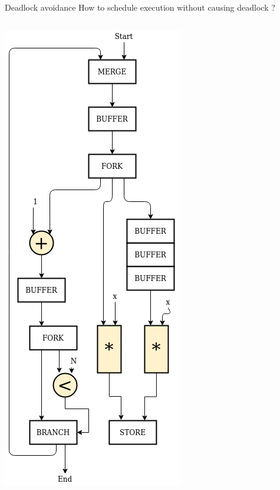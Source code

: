 \documentclass{beamer}
\begin{document}


\begin{frame}{Deadlock avoidance}
  How to schedule execution without causing deadlock ?
  \begin{columns}[T]
    \begin{column}{0.25\textwidth}
        \begin{center}
      \includegraphics[scale=0.25]{blocking_unshared.png}
    \end{center}
    \end{column}
    \begin{column}{0.1\textwidth}

\end{column}
\end{columns}
\end{frame}
\end{document}
